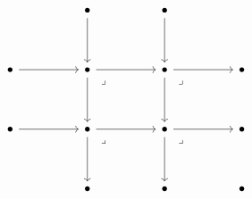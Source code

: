 \documentclass[preview]{standalone}
\begin{document}
\[\begin{tikzcd}
	&& \bullet && \bullet \\
	\\
	\bullet && \bullet && \bullet && \bullet \\
	\\
	\bullet && \bullet && \bullet && \bullet \\
	\\
	&& \bullet && \bullet && \bullet
	\arrow[from=3-3, to=5-3]
	\arrow[from=3-5, to=5-5]
	\arrow[from=5-3, to=5-5]
	\arrow[from=3-3, to=3-5]
	\arrow["\lrcorner"{anchor=center, pos=0.125}, draw=none, from=3-3, to=5-5]
	\arrow[from=3-1, to=3-3]
	\arrow[from=5-1, to=5-3]
	\arrow[from=3-5, to=3-7]
	\arrow[from=5-5, to=5-7]
	\arrow[from=1-5, to=3-5]
	\arrow[from=1-3, to=3-3]
	\arrow[from=5-3, to=7-3]
	\arrow[from=5-5, to=7-5]
	\arrow["\lrcorner"{anchor=center, pos=0.125}, draw=none, from=5-3, to=7-5]
	\arrow["\lrcorner"{anchor=center, pos=0.125}, draw=none, from=3-5, to=5-7]
	\arrow["\lrcorner"{anchor=center, pos=0.125}, draw=none, from=5-5, to=7-7]
\end{tikzcd}\]
\end{document}
